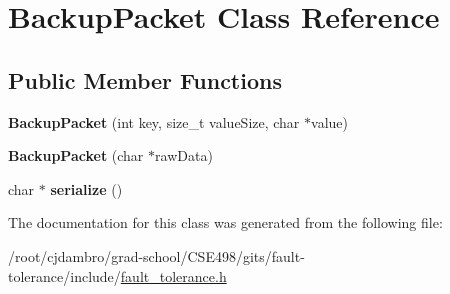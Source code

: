 \hypertarget{classBackupPacket}{\section{Backup\-Packet Class Reference}
\label{classBackupPacket}
}
\subsection*{Public Member Functions}
\begin{DoxyCompactItemize}
\item 
\hypertarget{classBackupPacket_a8d2be31a0df7ed251d6969dc4848036e}{{\bfseries Backup\-Packet} (int key, size\-\_\-t value\-Size, char $\ast$value)}\label{classBackupPacket_a8d2be31a0df7ed251d6969dc4848036e}

\item 
\hypertarget{classBackupPacket_a4747d2d6ee0a82fd026053e1167d5e38}{{\bfseries Backup\-Packet} (char $\ast$raw\-Data)}\label{classBackupPacket_a4747d2d6ee0a82fd026053e1167d5e38}

\item 
\hypertarget{classBackupPacket_ae436912e519b99db90a2ee70cc7ad7c8}{char $\ast$ {\bfseries serialize} ()}\label{classBackupPacket_ae436912e519b99db90a2ee70cc7ad7c8}

\end{DoxyCompactItemize}


The documentation for this class was generated from the following file\-:\begin{DoxyCompactItemize}
\item 
/root/cjdambro/grad-\/school/\-C\-S\-E498/gits/fault-\/tolerance/include/\hyperlink{fault__tolerance_8h}{fault\-\_\-tolerance.\-h}\end{DoxyCompactItemize}
